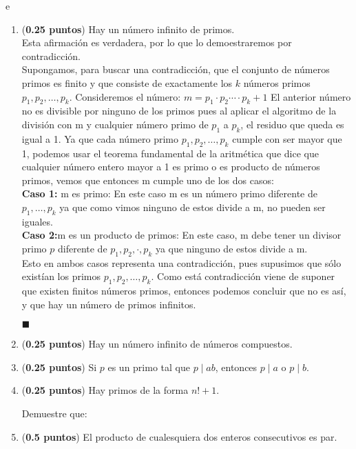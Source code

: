 e\documentclass[fontsize=12pt]{scrartcl}
\begin{document}
\begin{enumerate}
		\item ({\bf 0.25 puntos})
		Hay un n\'umero infinito de primos. \\
	        Esta afirmación es verdadera, por lo que lo demoestraremos por contradicción. \\
                Supongamos, para buscar una contradicción, que el conjunto de números primos es finito y que consiste de exactamente los $k$ números primos $p_1, p_2, \dots, p_k$. Consideremos el número: $m = p_1 \cdot p_2 \cdots \cdot p_k + 1$
El anterior número no es divisible por ninguno de los primos
pues  al aplicar el algoritmo de la división con m y cualquier número primo de $p_1 $ a $p_k$, el residuo que queda es igual a 1. Ya que cada número primo $p_1, p_2, \dots, p_k$ cumple con ser mayor que 1, podemos usar el teorema fundamental de la aritmética que dice que cualquier número entero mayor a 1  es primo o  es producto de números primos, vemos que entonces m cumple uno de los dos casos:\\
\textbf{Caso 1:} m es primo:
En este caso m es un número primo diferente de $p_1, \dots, p_k$ ya que como vimos ninguno de estos divide a m, no pueden ser iguales.\\
\textbf{Caso 2:}m es un producto de primos:
En este caso, m debe tener un divisor primo $p$ diferente de $p_1, p_2, \cdot, p_k$ ya que ninguno de estos divide a m. \\
Esto en ambos casos representa una contradicción, pues supusimos que sólo existían los primos $p_1, p_2, \dots, p_k$. Como está contradicción viene de suponer que existen finitos números primos, entonces podemos concluir que no es así, y que hay un número de primos infinitos.
\begin{flushright}
  $\blacksquare$
\end{flushright}


                
		\item ({\bf 0.25 puntos})
		Hay un n\'umero infinito de n\'umeros compuestos.
		
		\item ({\bf 0.25 puntos})
		Si $ p $ es un primo tal que $ p \mid ab $, entonces $ p \mid  a $ 
		o $ p \mid b $.
		
		\item ({\bf 0.25 puntos})
		Hay primos de la forma $n! + 1 $.
		
	
	Demuestre que:
				
		\item ({\bf 0.5 puntos})
		El producto de cualesquiera dos enteros consecutivos es par.
		

\end{enumerate}
\end{document}
